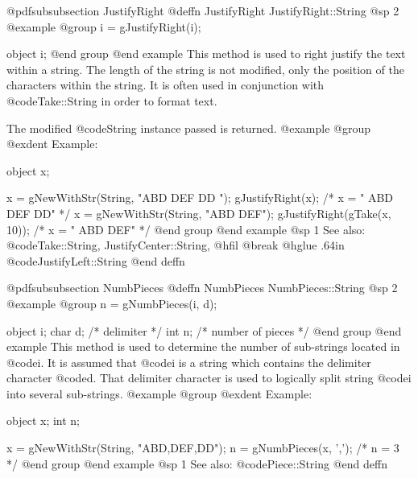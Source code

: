 @pdfsubsubsection {JustifyRight}
@deffn {JustifyRight} JustifyRight::String
@sp 2
@example
@group
i = gJustifyRight(i);

object  i;
@end group
@end example
This method is used to right justify the text within a string.  The length
of the string is not modified, only the position of the characters within
the string.  It is often used in conjunction with @code{Take::String} in
order to format text.

The modified @code{String} instance passed is returned.
@example
@group
@exdent Example:

object  x;

x = gNewWithStr(String, "ABD  DEF  DD    ");
gJustifyRight(x);   /*  x = "    ABD  DEF  DD"    */
x = gNewWithStr(String, "ABD  DEF");
gJustifyRight(gTake(x, 10));   /*  x = "  ABD  DEF"    */
@end group
@end example
@sp 1
See also:  @code{Take::String, JustifyCenter::String,}
@hfil @break @hglue .64in       @code{JustifyLeft::String}
@end deffn













@pdfsubsubsection {NumbPieces}
@deffn {NumbPieces} NumbPieces::String
@sp 2
@example
@group
n = gNumbPieces(i, d);

object  i;
char    d;  /*  delimiter         */
int     n;  /*  number of pieces  */
@end group
@end example
This method is used to determine the number of sub-strings located in
@code{i}.  It is assumed that @code{i} is a string which contains the
delimiter character @code{d}.  That delimiter character is used to
logically split string @code{i} into several sub-strings.
@example
@group
@exdent Example:

object  x;
int     n;

x = gNewWithStr(String, "ABD,DEF,DD");
n = gNumbPieces(x, ',');  /*  n = 3  */
@end group
@end example
@sp 1
See also:  @code{Piece::String}
@end deffn


























